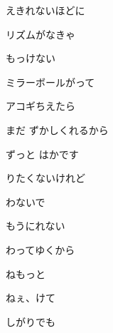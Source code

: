 \documentclass[a4paper,tate,twocolumn,12pt]{ltjtarticle}
\begin{document}
\begin{flushleft}
\begin{minipage}{\linewidth}
えきれないほどに

リズムがなきゃ

もっけない

ミラーボールがって

アコギちえたら

まだ ずかしくれるから

ずっと はかです

りたくないけれど

わないで

もうにれない

わってゆくから

ねもっと

ねぇ、けて

しがりでも
\end{minipage}

\end{flushleft}
\end{document}
